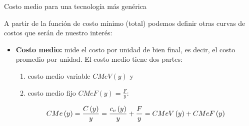 \documentclass{beamer}
\theoremstyle{definition}
\begin{document}

\begin{frame}{Costo medio para una tecnología más genérica}%



A partir de la funci\'{o}n de costo m\'inimo (total) podemos definir otras
curvas de costos que ser\'{a}n de nuestro inter\'{e}s:
\begin{itemize}
\item \textbf{Costo medio:} mide el costo por unidad de bien final, es decir, el costo
promedio por unidad. El costo medio tiene dos partes:
\begin{enumerate}
    \item costo medio variable $CMeV(y)$ y \vspace{3pt}
    \item costo medio fijo $CMeF(y)=\frac{F}{y}$:
\end{enumerate}

\begin{align*}
CMe\left( y\right) =\frac{C\left( y\right) }{y}=\frac{c_{v}\left( y\right) }{%
y}+\frac{F}{y}=CMeV\left( y\right) +CMeF\left( y\right)
\end{align*}
\end{itemize}
\end{frame}
\end{document}
